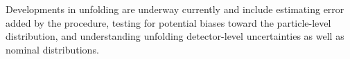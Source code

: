 


Developments in unfolding are underway currently and include estimating error added by the procedure, testing for potential biases toward the particle-level distribution, and understanding unfolding detector-level uncertainties as well as nominal distributions. 

